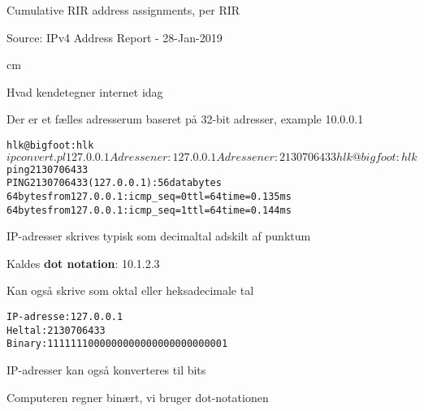 \documentclass[Screen16to9,17pt]{foils}
\begin{document}

\centerline{Cumulative RIR address assignments, per RIR}

\begin{list1}
\item Source:
IPv4 Address Report - 28-Jan-2019
\end{list1}


 cm

\begin{list1}
\item Hvad kendetegner internet idag
\item Der er et fælles adresserum baseret på 32-bit adresser, example 10.0.0.1
\end{list1}


\begin{alltt}
hlk@bigfoot:hlk$ ipconvert.pl 127.0.0.1
Adressen er: 127.0.0.1
Adressen er: 2130706433
hlk@bigfoot:hlk$ ping 2130706433
PING 2130706433 (127.0.0.1): 56 data bytes
64 bytes from 127.0.0.1: icmp_seq=0 ttl=64 time=0.135 ms
64 bytes from 127.0.0.1: icmp_seq=1 ttl=64 time=0.144 ms
\end{alltt}

\begin{list1}
\item IP-adresser skrives typisk som decimaltal adskilt af punktum
\item Kaldes {\bf dot notation}: 10.1.2.3
\item Kan også skrive som oktal eller heksadecimale tal
\end{list1}


\begin{alltt}
IP-adresse: 127.0.0.1
Heltal:	2130706433
Binary:	1111111000000000000000000000001
\end{alltt}

\begin{list1}
\item IP-adresser kan også konverteres til bits
\item Computeren regner binært, vi bruger dot-notationen
\end{list1}

\end{document}
